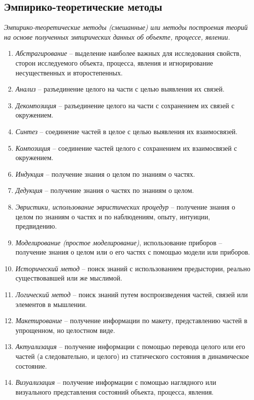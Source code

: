 \subsection{Эмпирико-теоретические методы}
\emph{Эмпирико-теоретические методы (смешанные) или методы построения теорий на основе полученных эмпирических данных об объекте, процессе, явлении.}
\begin{enumerate}
\item \emph{Абстрагирование} -- выделение наиболее важных для исследования свойств, сторон исследуемого объекта, процесса, явления и игнорирование несущественных и второстепенных.
\item \emph{Анализ} -- разъединение целого на части с целью выявления их связей.
\item \emph{Декомпозиция} -- разъединение целого на части с сохранением их связей с окружением.
\item \emph{Синтез} -- соединение частей в целое с целью выявления их взаимосвязей.
\item \emph{Композиция} -- соединение частей целого с сохранением их взаимосвязей с окружением.
\item \emph{Индукция} -- получение знания о целом по знаниям о частях.
\item \emph{Дедукция} -- получение знания о частях по знаниям о целом.
\item \emph{Эвристики, использование эвристических процедур} -- получение знания о целом по знаниям о частях и по наблюдениям, опыту, интуиции, предвидению.
\item \emph{Моделирование (простое моделирование)}, использование приборов -- получение знания о целом или о его частях с помощью модели или приборов.
\item \emph{Исторический метод} -- поиск знаний с использованием предыстории, реально существовавшей или же мыслимой.
\item \emph{Логический метод } -- поиск знаний путем воспроизведения частей, связей или элементов в мышлении.
\item \emph{Макетирование} -- получение информации по макету, представлению частей в упрощенном, но целостном виде.
\item \emph{Актуализация} -- получение информации с помощью перевода целого или его частей (а следовательно, и целого) из статического состояния в динамическое состояние.
\item \emph{Визуализация} -- получение информации с помощью наглядного или визуального представления состояний объекта, процесса, явления.
\end{enumerate}
